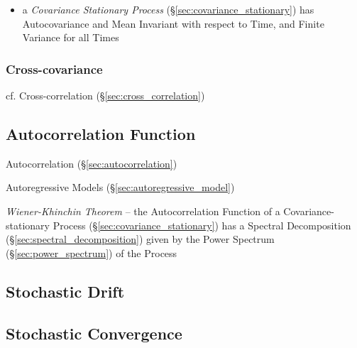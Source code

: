 \begin{itemize}
  \item a \emph{Covariance Stationary Process}
    (\S\ref{sec:covariance_stationary}) has Autocovariance and Mean
    Invariant with respect to Time, and Finite Variance for all Times
\end{itemize}



\subsubsection{Cross-covariance}\label{sec:cross_covariance}

cf. Cross-correlation (\S\ref{sec:cross_correlation})



\subsection{Autocorrelation Function}\label{sec:autocorrelation_function}

Autocorrelation (\S\ref{sec:autocorrelation})

Autoregressive Models (\S\ref{sec:autoregressive_model})

\emph{Wiener-Khinchin Theorem} -- the Autocorrelation Function of a
Covariance-stationary Process (\S\ref{sec:covariance_stationary}) has a Spectral
Decomposition (\S\ref{sec:spectral_decomposition}) given by the Power Spectrum
(\S\ref{sec:power_spectrum}) of the Process



\subsection{Stochastic Drift}\label{sec:stochastic_drift}

\subsection{Stochastic Convergence}\label{sec:stochastic_convergence}

